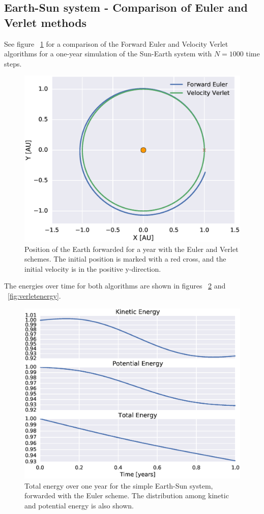 \documentclass[aps,reprint]{revtex4-1}
\begin{document}
\subsection{Earth-Sun system - Comparison of Euler and Verlet methods}
\label{sec:earthsunresults}
See figure ~\ref{fig:earthsunorbits} for a comparison of the Forward Euler and
Velocity Verlet algorithms for a one-year simulation of the Sun-Earth system with
$N = 1000$ time steps.
\begin{figure}[H]
  \centering
  \includegraphics[width=\columnwidth]{figures/eulerverlet.eps}
  \caption{Position of the Earth forwarded for a year with the Euler and Verlet
  schemes. The initial position is marked with a red cross, and the initial
  velocity is in the positive y-direction.}
  \label{fig:earthsunorbits}
\end{figure}
The energies over time for both algorithms
are shown in figures ~\ref{fig:eulerenergy} and ~\ref{fig:verletenergy}.
\begin{figure}[H]
  \includegraphics[width=\columnwidth]{figures/energy_euler.eps}
  \caption{Total energy over one year for the simple Earth-Sun system,
  forwarded with the Euler scheme. The distribution among kinetic and potential
  energy is also shown.}
  \label{fig:eulerenergy}
\end{figure}
\end{document}
